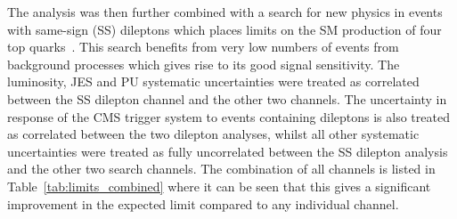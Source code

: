 The analysis was then further combined with a search for new physics in events with same-sign (SS) dileptons which places limits on the SM production of four top quarks~\cite{Khachatryan:2016kod}. This search benefits from very low numbers of events from background processes which gives rise to its good signal sensitivity. The luminosity, JES and PU systematic uncertainties were treated as correlated between the SS dilepton channel and the other two channels. The uncertainty in response of the CMS trigger system to events containing dileptons is also treated as correlated between the two dilepton analyses, whilst all other systematic uncertainties were treated as fully uncorrelated between the SS dilepton analysis and the other two search channels. The combination of all channels is listed in Table~\ref{tab:limits_combined} where it can be seen that this gives a significant improvement in the expected limit compared to any individual channel.

\clearpage

